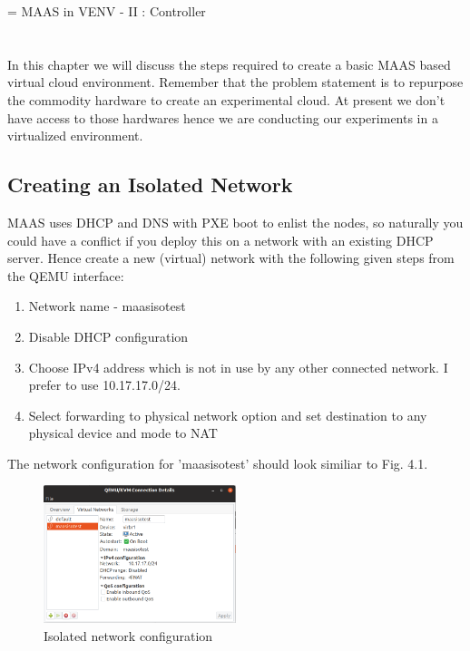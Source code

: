 \chapname = {MAAS in VENV - II : Controller}

\chapter{\the\chapname}

In this chapter we will discuss the steps required to create a basic MAAS based virtual cloud environment. Remember that the problem statement is to repurpose the commodity hardware to create an experimental cloud. At present we don't have access to those hardwares hence we are conducting our experiments in a virtualized environment. 

\section{Creating an Isolated Network}

MAAS uses DHCP and DNS with PXE boot to enlist the nodes, so naturally you could have a conflict if you deploy this on a network with an existing DHCP server. Hence create a new (virtual) network with the following given steps from the QEMU interface:

\begin{enumerate}
    \setlength\itemsep{0em}
    \item Network name - maasisotest
    \item Disable DHCP configuration
    \item Choose IPv4 address which is not in use by any other connected network. I prefer to use 10.17.17.0/24.
    \item Select forwarding to physical network option and set destination to any physical device and mode to NAT
\end{enumerate}

The network configuration for 'maasisotest' should look similiar to Fig. 4.1. 

\begin{figure}[!ht]
    \centering
    \includegraphics[width=0.5\textwidth]{images/4-1.png}
    \caption{Isolated network configuration}
\end{figure}

